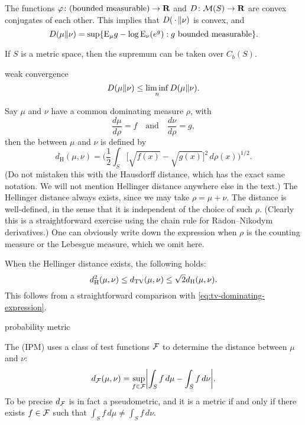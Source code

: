 \begin{namedthm}
The functions $\varphi\colon (\text{bounded measurable}) \to \mathbf{R}$ and $D\colon \mathcal{M}(S) \to \mathbf{R}$ are convex conjugates of each other. This implies that $D(\,\cdot\,\Vert \nu)$ is convex, and 
    \[
        D(\mu\Vert \nu) = \sup\{\mathop{}\!\mathrm{E}_\mu g - \log \mathop{}\!\mathrm{E}_\nu (e^g) : g \text{ bounded measurable}\}.
    \]
\end{namedthm}

If $S$ is a metric space, then the supremum can be taken over $C_b(S)$.

weak convergence
\[
    D(\mu\Vert \nu) \leq \liminf_n D(\mu\Vert \nu).
\]

\begin{namedthm}
    
\end{namedthm}

Say $\mu$ and $\nu$ have a common dominating measure $\rho$, with \[
    \frac{d\mu}{d\rho} = f\quad\text{and}\quad  \frac{d\nu}{d\rho} = g,
\]
then the  between $\mu$ and $\nu$ is defined by \[
    d_{\mathrm H}(\mu,\nu) = \biggl(\frac{1}{2} \int_S \bigl[\sqrt{f(x)} - \sqrt{g(x)}\bigr]^2\,d\rho(x)\biggr)^{1/2}.
\]
(Do not mistaken this with the Hausdorff distance, which has the exact same notation. We will not mention Hellinger distance anywhere else in the text.) The Hellinger distance always exists, since we may take $\rho = \mu + \nu$. The distance is well-defined, in the sense that it is independent of the choice of such $\rho$. (Clearly this is a straightforward exercise using the chain rule for Radon--Nikodym derivatives.) One can obviously write down the expression when $\rho$ is the counting measure or the Lebesgue measure, which we omit here.

When the Hellinger distance exists, the following holds: \[
    d_{\mathrm H}^2(\mu,\nu) \leq d_{\mathrm{TV}}(\mu,\nu) \leq \sqrt{2} d_{\mathrm H}(\mu,\nu).
\] This follows from a straightforward comparison with \eqref{eq:tv-dominating-expression}.

probability metric

The  (IPM) uses a class of test functions $\mathcal{F}$ to determine the distance between $\mu$ and $\nu$: \[
    d_{\mathcal{F}}(\mu,\nu) = \sup_{f \in \mathcal{F}} \biggl\vert \int_S f\,d\mu - \int_S f\,d\nu \bigg\vert.
\] To be precise $d_{\mathcal{F}}$ is in fact a pseudometric, and it is a metric if and only if there exists $f \in \mathcal{F}$ such that $\int_S f \,d\mu \neq \int_S f\,d\nu$.

